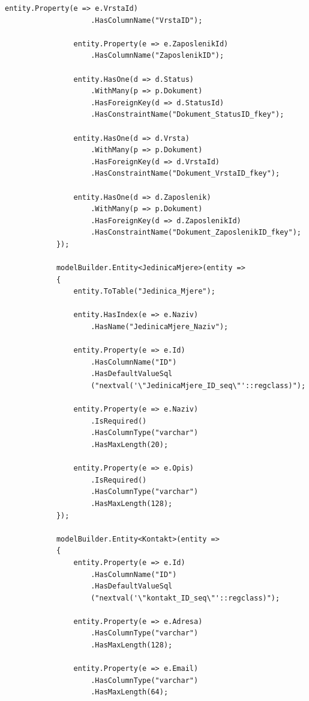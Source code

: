 \documentclass[a4paper,12pt]{foi}
\begin{document}
\begin{lstlisting}[language={[Sharp]C}]
                entity.Property(e => e.VrstaId)
                	.HasColumnName("VrstaID");

                entity.Property(e => e.ZaposlenikId)
                	.HasColumnName("ZaposlenikID");

                entity.HasOne(d => d.Status)
                    .WithMany(p => p.Dokument)
                    .HasForeignKey(d => d.StatusId)
                    .HasConstraintName("Dokument_StatusID_fkey");

                entity.HasOne(d => d.Vrsta)
                    .WithMany(p => p.Dokument)
                    .HasForeignKey(d => d.VrstaId)
                    .HasConstraintName("Dokument_VrstaID_fkey");

                entity.HasOne(d => d.Zaposlenik)
                    .WithMany(p => p.Dokument)
                    .HasForeignKey(d => d.ZaposlenikId)
                    .HasConstraintName("Dokument_ZaposlenikID_fkey");
            });

            modelBuilder.Entity<JedinicaMjere>(entity =>
            {
                entity.ToTable("Jedinica_Mjere");

                entity.HasIndex(e => e.Naziv)
                    .HasName("JedinicaMjere_Naziv");

                entity.Property(e => e.Id)
                    .HasColumnName("ID")
                    .HasDefaultValueSql
                    ("nextval('\"JedinicaMjere_ID_seq\"'::regclass)");

                entity.Property(e => e.Naziv)
                    .IsRequired()
                    .HasColumnType("varchar")
                    .HasMaxLength(20);

                entity.Property(e => e.Opis)
                    .IsRequired()
                    .HasColumnType("varchar")
                    .HasMaxLength(128);
            });

            modelBuilder.Entity<Kontakt>(entity =>
            {
                entity.Property(e => e.Id)
                    .HasColumnName("ID")
                    .HasDefaultValueSql
                    ("nextval('\"kontakt_ID_seq\"'::regclass)");

                entity.Property(e => e.Adresa)
                    .HasColumnType("varchar")
                    .HasMaxLength(128);

                entity.Property(e => e.Email)
                    .HasColumnType("varchar")
                    .HasMaxLength(64);


\end{lstlisting}
\end{document}
